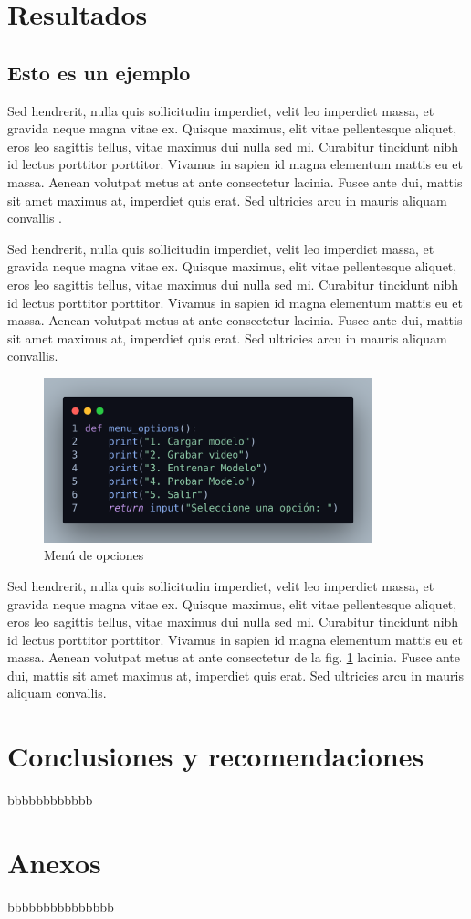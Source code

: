 \documentclass[12pt]{article}
\begin{document}
{%
\section{Resultados}
\subsection{Esto es un ejemplo}
Sed hendrerit, nulla quis sollicitudin imperdiet, velit leo imperdiet massa, et gravida neque magna vitae ex. Quisque maximus, elit vitae pellentesque aliquet, eros leo sagittis tellus, vitae maximus dui nulla sed mi. Curabitur tincidunt nibh id lectus porttitor porttitor. Vivamus in sapien id magna elementum mattis eu et massa. Aenean volutpat metus at ante consectetur lacinia. Fusce ante dui, mattis sit amet maximus at, imperdiet quis erat. Sed ultricies arcu in mauris aliquam convallis \cite{rivera2022implementacion}. \bigskip

Sed hendrerit, nulla quis sollicitudin imperdiet, velit leo imperdiet massa, et gravida neque magna vitae ex. Quisque maximus, elit vitae pellentesque aliquet, eros leo sagittis tellus, vitae maximus dui nulla sed mi. Curabitur tincidunt nibh id lectus porttitor porttitor. Vivamus in sapien id magna elementum mattis eu et massa. Aenean volutpat metus at ante consectetur lacinia. Fusce ante dui, mattis sit amet maximus at, imperdiet quis erat. Sed ultricies arcu in mauris aliquam convallis. \bigskip

\begin{figure}[h]
	\centering
	\includegraphics[width=0.85\textwidth]{imagenes/code.png}
	\caption{Menú de opciones}
	\label{fig_1}
\end{figure}



Sed hendrerit, nulla quis sollicitudin imperdiet, velit leo imperdiet massa, et gravida neque magna vitae ex. Quisque maximus, elit vitae pellentesque aliquet, eros leo sagittis tellus, vitae maximus dui nulla sed mi. Curabitur tincidunt nibh id lectus porttitor porttitor. Vivamus in sapien id magna elementum mattis eu et massa. Aenean volutpat metus at ante consectetur de la fig. \ref{fig_1} lacinia. Fusce ante dui, mattis sit amet maximus at, imperdiet quis erat. Sed ultricies arcu in mauris aliquam convallis. \bigskip


\section{Conclusiones y recomendaciones}
bbbbbbbbbbbb


\section{Anexos}
bbbbbbbbbbbbbbb





}
\end{document}
